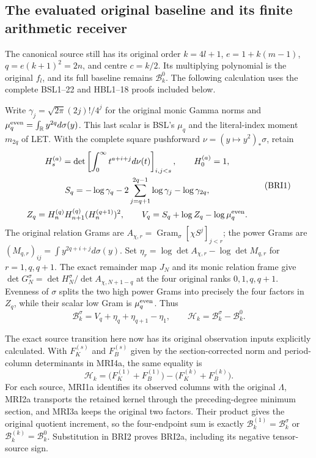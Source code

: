 \documentclass[11pt,a4paper]{article}
\begin{document}
\subsection{The evaluated original baseline and its finite arithmetic receiver}

The canonical source still has its original order $k=4l+1$,
$e=1+k(m-1)$, $q=e(k+1)^2=2n$, and centre $c=k/2$.
Its multiplying polynomial is the original $f_l$, and its full
baseline remains $\mathcal B_k^0$. The following calculation uses
the complete BSL1--22 and HBL1--18 proofs included below.

Write $\gamma_j=\sqrt{2\pi}(2j)!/4^j$ for the original monic
Gamma norms and $\mu_q^{\rm even}=\int_{\mathbb R}y^{2q}d\sigma(y)$.
This last scalar is BSL's $\mu_q$ and the literal-index moment
$m_{2q}$ of LET. With the complete square pushforward
$\nu=(y\mapsto y^2)_*\sigma$, retain
\[
\begin{gathered}
 H_s^{(a)}=\det\left[\int_0^\infty t^{a+i+j}d\nu(t)\right]_{i,j<s},
 \qquad H_0^{(a)}=1,\\
 S_q=-\log\gamma_q-2\sum_{j=q+1}^{2q-1}\log\gamma_j
                                             -\log\gamma_{2q},\\
 Z_q=H_n^{(q)}H_{n+1}^{(q)}(H_n^{(q+1)})^2,
 \qquad V_q=S_q+\log Z_q-\log\mu_q^{\rm even}.
\end{gathered}\tag{BRI1}
\]
The original relation Grams are
$A_{\chi,r}=\operatorname{Gram}_\sigma[\chi S^j]_{j<r}$;
the power Grams are
$(M_{q,r})_{ij}=\int y^{2q+i+j}d\sigma(y)$.
Set $\eta_r=\log\det A_{\chi,r}-\log\det M_{q,r}$ for
$r=1,q,q+1$. The exact remainder map $J_N$ and its monic
relation frame give $\det G_N^\sigma=\det H_N^\sigma/
\det A_{\chi,N+1-q}$ at the four original ranks $0,1,q,q+1$.
Evenness of $\sigma$ splits the two high power Grams into precisely
the four factors in $Z_q$, while their scalar low Gram is
$\mu_q^{\rm even}$. Thus
\[
 \mathcal B_k^\sigma=V_q+\eta_q+\eta_{q+1}-\eta_1,
 \qquad \mathcal H_k=\mathcal B_k^\sigma-\mathcal B_k^0.
 \tag{BRI2}
\]

The exact source transition here now has its original observation
inputs explicitly calculated. With $F_K^{(s)}$ and $F_B^{(s)}$
given by the section-corrected norm and period-column determinants
in MRI4a, the same equality is
\[
 \mathcal H_k
   =\bigl(F_K^{(1)}+F_B^{(1)}\bigr)
       -\bigl(F_K^{(k)}+F_B^{(k)}\bigr).
 \tag{BRI2a}
\]
For each source, MRI1a identifies its observed columns with
the original $\Lambda$, MRI2a transports the retained kernel
through the preceding-degree minimum section, and MRI3a keeps
the original two factors. Their product gives the original
quotient increment, so the four-endpoint sum is exactly
$\mathcal B_k^{(1)}=\mathcal B_k^\sigma$ or
$\mathcal B_k^{(k)}=\mathcal B_k^0$. Substitution in BRI2
proves BRI2a, including its negative tensor-source sign.
\end{document}
